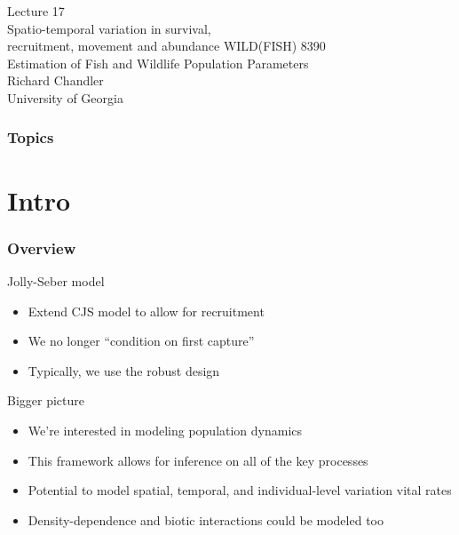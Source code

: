 \documentclass[color=usenames,dvipsnames]{beamer}\usepackage[]{graphicx}\usepackage[]{color}
\begin{document}
\begin{frame}[plain]
  \centering
  \LARGE
  Lecture 17 \\ Spatio-temporal variation in %
  survival, \\ recruitment, movement and abundance %
  \vfill
  \large
  WILD(FISH) 8390 \\
  Estimation of Fish and Wildlife Population Parameters \\
  \vfill
  Richard Chandler \\
  University of Georgia \\
\end{frame}







\begin{frame}[plain]
  \frametitle{Topics}
  \Large
\end{frame}




\section{Intro}






\begin{frame}
  \frametitle{Overview}
  {Jolly-Seber model}
  \begin{itemize}
    \normalsize
    \item Extend CJS model to allow for recruitment
    \item We no longer ``condition on first capture''
    \item Typically, we use the robust design
  \end{itemize}
  \pause \vfill
  Bigger picture
  \begin{itemize}
    \normalsize
    \item<2-> We're interested in modeling population dynamics
    \item<3-> This framework allows for inference on \alert{all} of the
      key processes 
    \item<4-> Potential to model spatial, temporal, and individual-level
      variation vital rates
    \item<5-> Density-dependence and biotic interactions could be
      modeled too
  \end{itemize}
\end{frame}
\end{document}
